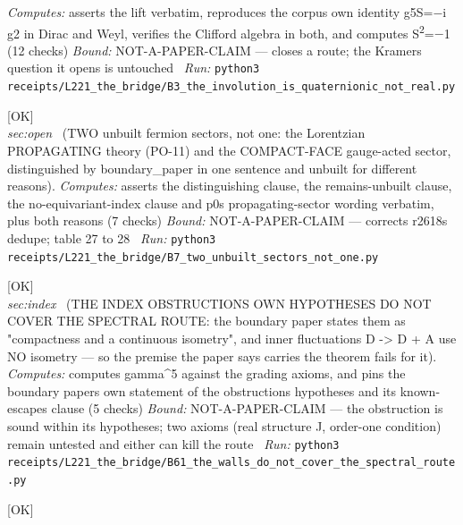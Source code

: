 \begin{description}
\emph{Computes:} asserts the lift verbatim, reproduces the corpus own identity g5S=\ensuremath{-}i g2 in Dirac and Weyl, verifies the Clifford algebra in both, and computes S\textsuperscript{2}=\ensuremath{-}1 (12 checks)
 \emph{Bound:} NOT-A-PAPER-CLAIM --- closes a route; the Kramers question it opens is untouched
\ \emph{Run:} \texttt{python3 receipts/L221\_the\_bridge/B3\_the\_involution\_is\_quaternionic\_not\_real.py}
\item[\label{rcpt:B7_two_unbuilt_sectors_not_one}\textbf{}\quad\texttt{B7\_two\_unbuilt\_sectors\_not\_one}]\hfill\textsf{[OK]}\\
\textit{sec:open} \ (TWO unbuilt fermion sectors, not one: the Lorentzian PROPAGATING theory (PO-11) and the COMPACT-FACE gauge-acted sector, distinguished by boundary\_paper in one sentence and unbuilt for different reasons). 
\emph{Computes:} asserts the distinguishing clause, the remains-unbuilt clause, the no-equivariant-index clause and p0s propagating-sector wording verbatim, plus both reasons (7 checks)
 \emph{Bound:} NOT-A-PAPER-CLAIM --- corrects r2618s dedupe; table 27 to 28
\ \emph{Run:} \texttt{python3 receipts/L221\_the\_bridge/B7\_two\_unbuilt\_sectors\_not\_one.py}
\item[\label{rcpt:B61_the_walls_do_not_cover_the_spectral_route}\textbf{}\quad\texttt{B61\_the\_walls\_do\_not\_cover\_the\_spectral\_route}]\hfill\textsf{[OK]}\\
\textit{sec:index} \ (THE INDEX OBSTRUCTIONS OWN HYPOTHESES DO NOT COVER THE SPECTRAL ROUTE: the boundary paper states them as "compactness and a continuous isometry", and inner fluctuations D -> D + A use NO isometry --- so the premise the paper says carries the theorem fails for it). 
\emph{Computes:} computes gamma\textasciicircum{}5 against the grading axioms, and pins the boundary papers own statement of the obstructions hypotheses and its known-escapes clause (5 checks)
 \emph{Bound:} NOT-A-PAPER-CLAIM --- the obstruction is sound within its hypotheses; two axioms (real structure J, order-one condition) remain untested and either can kill the route
\ \emph{Run:} \texttt{python3 receipts/L221\_the\_bridge/B61\_the\_walls\_do\_not\_cover\_the\_spectral\_route.py}
\item[\label{rcpt:C1_the_degree_six_dial_has_three_readings_and_the_paper_excludes_one}\textbf{}\quad\texttt{C1\_the\_degree\_six\_dial\_has\_three\_readings\_and\_the\_paper\_excludes\_one}]\hfill\textsf{[OK]}\\

\end{description}
